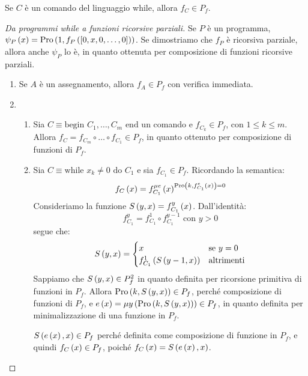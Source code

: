 \documentclass{lectures}
\begin{document}
\begin{theorem}
    Se \(C\) è un comando del linguaggio while, allora \(f_C \in P_f\).
\end{theorem}
\begin{proof}[Da programmi while a funzioni ricorsive parziali]
    Se \(P\) è un programma, \(\psi_P\left(x\right) = \text{Pro}\left(1, f_P\left(\left[0, x, 0, \ldots, 0\right]\right)\right)\). Se dimostriamo che \(f_P\) è ricorsiva parziale, allora anche \(\psi_P\) lo è, in quanto ottenuta per composizione di funzioni ricorsive parziali.
    \begin{enumerate}
        \item Se \(A\) è un assegnamento, allora \(f_A \in P_f\) con verifica immediata.
        \item \begin{enumerate}
            \item Sia \(C \equiv \text{begin }C_1, \ldots, C_m\text{ end}\) un comando e \(f_{C_k} \in P_f\), con \(1\leq k \leq m\). Allora \(f_C = f_{C_m} \circ \ldots \circ f_{C_1} \in P_f\), in quanto ottenuto per composizione di funzioni di \(P_f\).
            \item Sia \(C \equiv \text{while }x_k \neq 0 \text{ do }C_1\) e sia \(f_{C_1} \in P_f\). Ricordando la semantica:
            \[
                f_C\left(x\right) = f^{\mu e}_{C_1}\left(x\right)^{\text{Pro}\left(k, f^{e}_{C_1}\left(x\right)\right)=0}
            \]
            Consideriamo la funzione \(S\left(y,x\right) = f^y_{C_1}\left(x\right)\). Dall'identità:
            \[
                f^y_{C_1} = f^1_{C_1} \circ f^{y-1}_{C_1} \text{ con }y>0
            \]
            segue che:
            \[
                S\left(y,x\right) = \begin{cases}
                    x & \text{se }y=0\\
                    f^{1}_{C_1}\left(S\left(y-1, x\right)\right) & \text{altrimenti}
                \end{cases}
            \]
            Sappiamo che \(S\left(y,x\right) \in P^2_f\) in quanto definita per ricorsione primitiva di funzioni in \(P_f\). Allora \(\text{Pro}\left(k, S\left(y,x\right)\right) \in P_f\), perché composizione di funzioni di \(P_f\), e \(e\left(x\right) = \mu y \left(\text{Pro}\left(k, S\left(y,x\right)\right)\right) \in P_f\), in quanto definita per minimalizzazione di una funzione in \(P_f\).
            
            \(S\left(e\left(x\right), x\right) \in P_f\) perché definita come composizione di funzione in \(P_f\), e quindi \(f_C\left(x\right) \in P_f\), poiché \(f_C\left(x\right) = S\left(e\left(x\right), x\right)\).
        \end{enumerate}
    \end{enumerate}
\end{proof}
\end{document}
